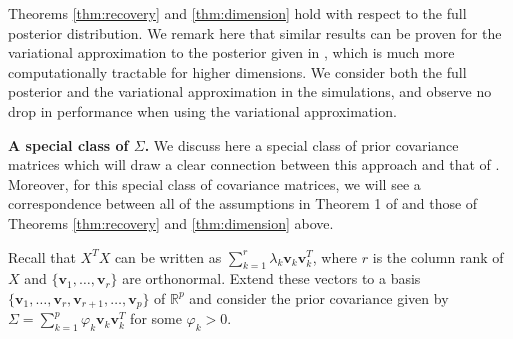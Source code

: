 \documentclass[11pt]{article}
\newcommand{\subparspacenonewline}{\vspace{3mm}}
\newcommand{\R}{\mathbb{R}}
\numberwithin{equation}{section}
\begin{document}
\begin{remark}\label{rem:var_approx}
	Theorems \ref{thm:recovery} and \ref{thm:dimension} hold with respect to the full posterior distribution. We remark here that similar results can be proven for the variational approximation to the posterior given in \cite{Ray_Szabo_2020}, which is much more computationally tractable for higher dimensions. We consider both the full posterior and the variational approximation in the simulations, and observe no drop in performance when using the variational approximation.
\end{remark}
\subparspacenonewline
{\bf A special class of $\Sigma$.} We discuss here a special class of prior covariance matrices which will draw a clear connection between this approach and that of \cite{CBM2020}. Moreover, for this special class of covariance matrices, we will see a correspondence between all of the assumptions in Theorem 1 of \cite{CBM2020} and those of Theorems \ref{thm:recovery} and \ref{thm:dimension} above.

Recall that $X^TX$ can be written as $\sum_{k = 1}^r \lambda_k \mathbf{v}_k \mathbf{v}_k^T$, where $r$ is the column rank of $X$ and $\{\mathbf{v}_1, \dots, \mathbf{v}_r\}$ are orthonormal. Extend these vectors to a basis $\{\mathbf{v}_1, \dots,\mathbf{v}_r, \mathbf{v}_{r+1},\dots,  \mathbf{v}_p\}$ of $\R^p$ and consider the prior covariance given by $\Sigma = \sum_{k = 1}^p \varphi_k \mathbf{v}_k \mathbf{v}_k^T$ for some $\varphi_k > 0$.

\end{document}
